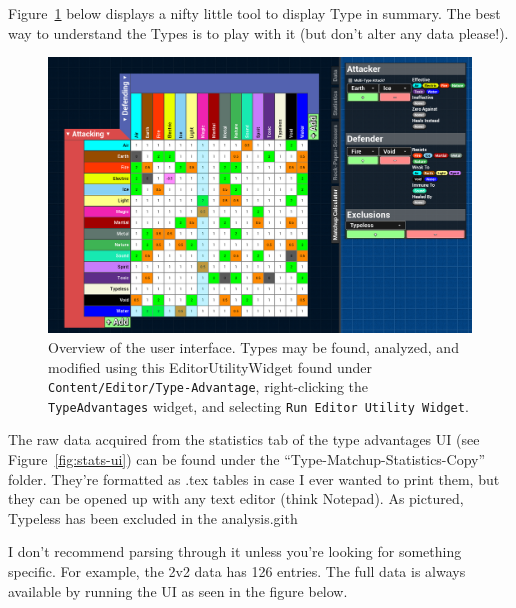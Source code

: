 \newpage


Figure~\ref{fig:ui} below displays a nifty little tool to display Type in summary. The best way to understand the Types is to play with it (but don't alter any data please!).

\begin{figure}[H]
	\centering
	\includegraphics[width=\textwidth]{ui-overview}
	\caption{Overview of the user interface. Types may be found, analyzed, and modified using this EditorUtilityWidget found under \texttt{Content/Editor/Type-Advantage}, right-clicking the \texttt{TypeAdvantages} widget, and selecting \texttt{Run Editor Utility Widget}.}
	\label{fig:ui}
\end{figure}

The raw data acquired from the statistics tab of the type advantages UI (see Figure~\ref{fig:stats-ui}) can be found under the ``Type-Matchup-Statistics-Copy'' folder. They're formatted as .tex tables in case I ever wanted to print them, but they can be opened up with any text editor (think Notepad). As pictured, Typeless has been excluded in the analysis.gith

I don't recommend parsing through it unless you're looking for something specific. For example, the 2v2 data has 126 entries. The full data is always available by running the UI as seen in the figure below.

